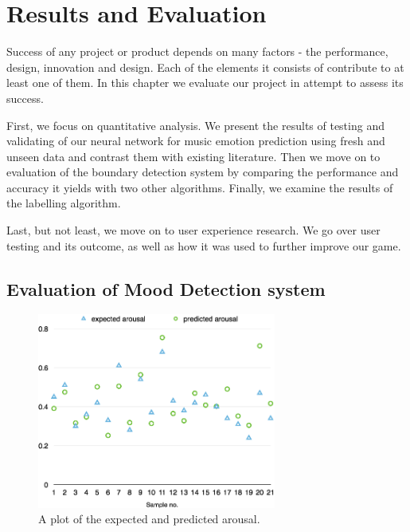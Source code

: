 
\chapter{Results and Evaluation} %

\label{Chapter6} %



Success of any project or product depends on many factors - the performance, design, innovation and design. Each of the elements it consists of contribute to at least one of them. 
In this chapter we evaluate our project in attempt to assess its success.

First, we focus on quantitative analysis. We present the results of testing and validating of our neural network for music emotion prediction using fresh and unseen data and contrast them with existing literature. Then we move on to evaluation of the boundary detection system by comparing the performance and accuracy it yields with two other algorithms. Finally, we examine the results of the labelling algorithm.

Last, but not least, we move on to user experience research. We go over user testing and its outcome, as well as how it was used to further improve our game. 

\vspace{10pt}

\section{Evaluation of Mood Detection system}

\begin{figure}[t]
    \includegraphics[width=0.7\textwidth]{Figures/finalarousal}
    \centering

  \caption{A plot of the expected and predicted arousal.}
  \label{fig:finalarousal}
\end{figure}


